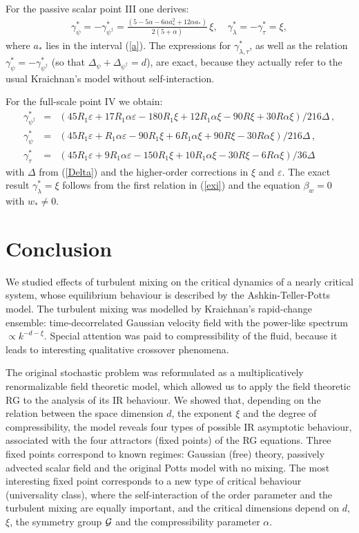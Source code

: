 \documentclass[12pt]{iopart}
\begin{document}
For the passive scalar point III one derives:
\begin{eqnarray}
\gamma_{\psi}^{*} = -\gamma_{\psi^{\dag}}^{*} =
\frac{(5-5\alpha-6\alpha a_{*}^{2} +12 \alpha a_{*})}{2(5+\alpha)}\,\xi ,
\quad
\gamma_{\lambda}^{*} = - \gamma_{\tau}^{*}  = \xi,
\label{dimPS}
\end{eqnarray}
where $a_{*}$ lies in the interval (\ref{a}).
The expressions for $\gamma_{\lambda,\tau}^{*}$, as well as the relation
$\gamma_{\psi}^{*}=-\gamma_{\psi^{\dag}}^{*}$
(so that $\Delta_{\psi}+\Delta_{\psi^{\dag}}=d$), are exact, because they
actually refer to the usual Kraichnan's model without self-interaction.

For the full-scale point IV we obtain:
\begin{eqnarray}
\gamma_{\psi^{\dag}}^{*} &=&
{(45R_{1}\varepsilon + 17R_{1}\alpha\varepsilon -180 R_{1}\xi
+12R_{1}\alpha\xi  -90R\xi+30R\alpha\xi)} / 216 \Delta \, ,
\nonumber\\
\gamma_{\psi}^{*} &=&
{(45R_{1}\varepsilon + R_{1}\alpha\varepsilon -90 R_{1}\xi
+6R_{1}\alpha\xi  +90R\xi-30R\alpha\xi)} / 216 \Delta \, ,
\nonumber\\
\gamma_{\tau}^{*} &=&
{(45R_{1}\varepsilon + 9R_{1}\alpha\varepsilon -150 R_{1}\xi
+10R_{1}\alpha\xi  -30R\xi-6R\alpha\xi)} / 36 \Delta
\label{dimFs}
\end{eqnarray}
with $\Delta$ from (\ref{Delta}) and the higher-order corrections in $\xi$
and $\varepsilon$. The exact result $\gamma_{\lambda}^{*} = \xi$ follows
from the first relation in (\ref{exi}) and the equation $\beta_{w}=0$ with
$w_{*}\ne0$.


\section{Conclusion} \label{sec:Conc}


We studied effects of turbulent mixing on the critical dynamics of a nearly
critical system, whose equilibrium behaviour is described by the
Ashkin-Teller-Potts model. The turbulent mixing was modelled by Kraichnan's
rapid-change ensemble: time-decorrelated Gaussian velocity field with the
power-like spectrum $\propto k^{-d-\xi}$. Special attention was paid to
compressibility of the fluid, because it leads to interesting qualitative
crossover phenomena.

The original stochastic problem was reformulated as a multiplicatively
renormalizable field theoretic model, which allowed us to apply the field
theoretic RG to the analysis of its IR behaviour. We showed that, depending
on the relation between the space dimension $d$, the exponent $\xi$ and
the degree of compressibility,
the model reveals four types of possible IR asymptotic behaviour,
associated with the four attractors (fixed points) of the RG equations.
Three fixed points correspond to known regimes: Gaussian (free) theory,
passively advected scalar field and the original Potts model with no mixing.
The most interesting fixed point corresponds to a new type of critical
behaviour (universality class), where the self-interaction of the order
parameter and the turbulent mixing are equally important, and the critical
dimensions depend on $d$, $\xi$, the symmetry group ${\cal G}$ and the
compressibility parameter $\alpha$.
\end{document}
